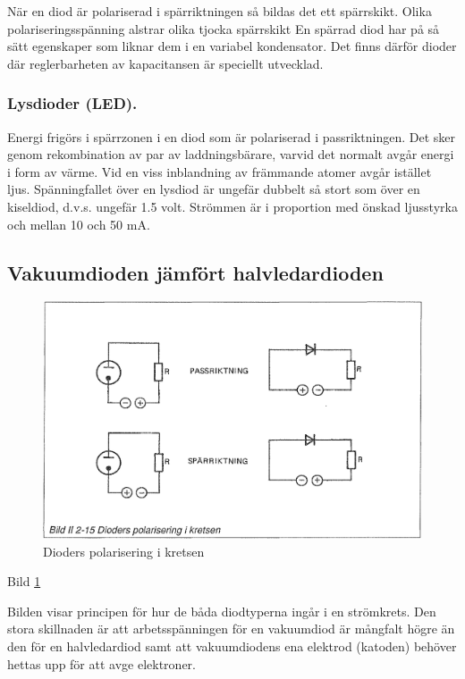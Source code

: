   När en diod är polariserad i spärriktningen så bildas det ett spärrskikt.
  Olika polariseringsspänning alstrar olika tjocka spärrskikt En spärrad diod
  har på så sätt egenskaper som liknar dem i en variabel kondensator. Det finns
  därför dioder där reglerbarheten av kapacitansen är speciellt utvecklad.

\subsubsection{Lysdioder (LED).}

  Energi frigörs i spärrzonen i en diod som är polariserad i passriktningen. Det
  sker genom rekombination av par av laddningsbärare, varvid det normalt avgår
  energi i form av värme. Vid en viss inblandning av främmande atomer avgår
  istället ljus. Spänningfallet över en lysdiod är ungefär dubbelt så stort som
  över en kiseldiod, d.v.s. ungefär 1.5 volt. Strömmen är i proportion med
  önskad ljusstyrka och mellan 10 och 50 mA.


\subsection{Vakuumdioden jämfört halvledardioden}

\begin{figure}
\includegraphics[width=\textwidth]{images/bild_2_2-15}
\caption{Dioders polarisering i kretsen}
\label{fig:BildII2-15}
\end{figure}

Bild \ref{fig:BildII2-15}

Bilden visar principen för hur de båda diodtyperna ingår i en strömkrets. Den
stora skillnaden är att arbetsspänningen för en vakuumdiod är mångfalt högre än
den för en halvledardiod samt att vakuumdiodens ena elektrod (katoden) behöver
hettas upp för att avge elektroner.
